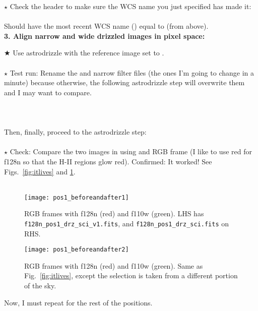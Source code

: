 \documentclass[11pt,obeyspaces]{article} %
\begin{document}
\begin{shaded}
$\star$ Check the header to make sure the WCS name you just specified has made it: \\
\\
Should have the most recent WCS name () equal to  (from above). \\ 

{\bf 3. Align narrow and wide drizzled images in pixel space:}

$\bigstar$ Use astrodrizzle with the reference image set to .\\ \\
$\star$  Test run: Rename the  and  narrow filter files (the ones I'm going to change in a minute) because otherwise, the following astrodrizzle step will overwrite them and I may want to compare. \\
\\
\\ \\
Then, finally, proceed to the astrodrizzle step: \\
\\
$\star$ Check: Compare the two images in  using and RGB frame (I like to use red for f128n so that the H-II regions glow red). Confirmed: It worked! See Figs.~\ref{fig:itlives} and \ref{fig:itlives2}. \\ \\

\end{shaded}

\begin{figure}
\centering
\begin{minipage}[b]{.45\linewidth}
\texttt{[image: pos1\_beforeandafter1]}
\caption{RGB frames with f128n (red) and f110w (green). LHS has \texttt{f128n\_pos1\_drz\_sci\_v1.fits}, and \texttt{f128n\_pos1\_drz\_sci.fits} on RHS.}
\label{fig:itlives}
\end{minipage}
\quad
\begin{minipage}[b]{.45\linewidth}
\texttt{[image: pos1\_beforeandafter2]}
\caption{RGB frames with f128n (red) and f110w (green). Same as Fig.~\ref{fig:itlives}, except the selection is taken from a different portion of the sky.}
\label{fig:itlives2}
\end{minipage}
\end{figure}

Now, I must repeat for the rest of the positions. 
\end{document}
